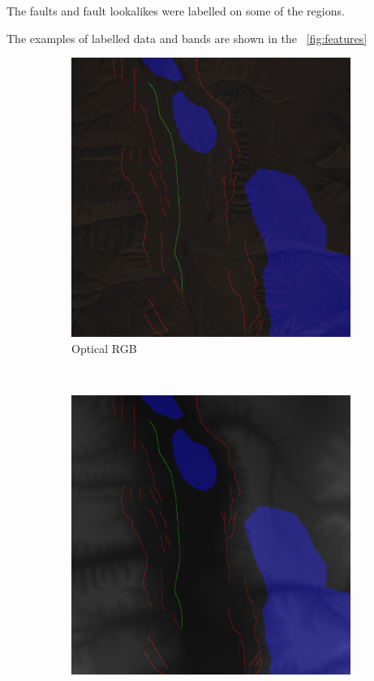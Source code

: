 \documentclass[11pt,a4paper]{article}
\begin{document}
The faults and fault lookalikes were labelled on some of the regions.

The examples of labelled data and bands are shown in the \figurename~\ref{fig:features}
\begin{figure}[t]
    \centering
    \begin{subfigure}[b]{0.18\textwidth}
        \includegraphics[width=\textwidth]{graphics/data/0/features_optical_rgb.png}
        \caption{Optical RGB}
        \label{fig:features_optical_rgb}
    \end{subfigure}
    ~
    \begin{subfigure}[b]{0.18\textwidth}
        \includegraphics[width=\textwidth]{graphics/data/0/features_elevation.png}

\end{subfigure}
\end{figure}
\end{document}
